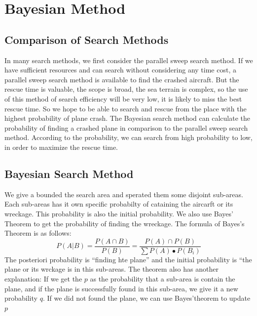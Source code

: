 \documentclass[11pt]{article}
\begin{document}
\hypertarget{Bayesian Method}{%
\section{Bayesian Method}\label{Bayesian method}}
\hypertarget{Comparison of search methods}{%
\subsection{Comparison of Search Methods}\label{Comparison of search methods}}
In many search methods, we first consider the parallel sweep search method. If we have sufficient resources and can search without considering any time cost, a parallel sweep search method is available to find the crashed aircraft. But the rescue time is valuable, the scope is broad, the sea terrain is complex, so the use of this method of search efficiency will be very low, it is likely to miss the best rescue time. So we hope to be able to search and rescue from the place with the highest probability of plane crash. The Bayesian search method can calculate the probability of finding a crashed plane in comparison to the parallel sweep search method. According to the probability, we can search from high probability to low, in order to maximize the rescue time.\\
\begin{center}
    \end{center}
\hypertarget{Bayesian Search method}{%
\subsection{Bayesian Search Method}\label{Bayesian search method}}
We give a bounded the search area and sperated them some disjoint
sub-areas. Each sub-areas has it own specific probabilty of cataining
the aircarft or its wreckage. This probability is also the initial
probability. We also use Bayes' Theorem to get the probability of
finding the wreckage. The formula of Bayes's Theorem is as follows:
\[P(A|B) = \frac{P(A \cap B)}{P(B)} = \frac{P(A)\cap P(B)}{\sum P(A)\bullet P(B_i)} \]
The posteriori probability is ``finding hte plane'' and the initial
probability is ``the plane or its wrckage is in this sub-areas. The
theorem also has another explanation: If we get the \(p\) as the
probability that a sub-area is contain the plane, and if the plane is
successfully found in this sub-area, we give it a new probability \(q\).
If we did not found the plane, we can use Bayes'theorem to update \(p\)
\end{document}
